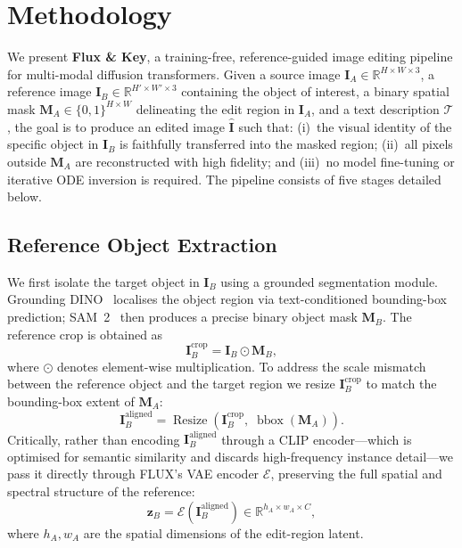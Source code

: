 \section{Methodology}
\label{sec:method}

We present \textbf{Flux \& Key}, a training-free, reference-guided image editing pipeline for
multi-modal diffusion transformers. Given a source image
$\mathbf{I}_A \in \mathbb{R}^{H \times W \times 3}$, a reference image
$\mathbf{I}_B \in \mathbb{R}^{H' \times W' \times 3}$ containing the object of interest, a
binary spatial mask $\mathbf{M}_A \in \{0,1\}^{H \times W}$ delineating the edit region in
$\mathbf{I}_A$, and a text description $\mathcal{T}$, the goal is to produce an edited image
$\hat{\mathbf{I}}$ such that:
(i)~the visual identity of the specific object in $\mathbf{I}_B$ is faithfully transferred into
the masked region;
(ii)~all pixels outside $\mathbf{M}_A$ are reconstructed with high fidelity; and
(iii)~no model fine-tuning or iterative ODE inversion is required.
The pipeline consists of five stages detailed below.

\subsection{Reference Object Extraction}

We first isolate the target object in $\mathbf{I}_B$ using a grounded segmentation module.
Grounding DINO~\citep{liu2023grounding} localises the object region via text-conditioned
bounding-box prediction; SAM~2~\citep{ravi2024sam2} then produces a precise binary object
mask $\mathbf{M}_B$.
The reference crop is obtained as
\begin{equation}
    \mathbf{I}_B^{\text{crop}} = \mathbf{I}_B \odot \mathbf{M}_B,
    \label{eq:crop}
\end{equation}
where $\odot$ denotes element-wise multiplication.
To address the scale mismatch between the reference object and the target region we resize
$\mathbf{I}_B^{\text{crop}}$ to match the bounding-box extent of $\mathbf{M}_A$:
\begin{equation}
    \mathbf{I}_B^{\text{aligned}} =
        \operatorname{Resize}\!\left(\mathbf{I}_B^{\text{crop}},\;
                                      \operatorname{bbox}(\mathbf{M}_A)\right).
    \label{eq:resize}
\end{equation}
Critically, rather than encoding $\mathbf{I}_B^{\text{aligned}}$ through a CLIP
encoder---which is optimised for semantic similarity and discards high-frequency instance
detail---we pass it directly through FLUX's VAE encoder $\mathcal{E}$,
preserving the full spatial and spectral structure of the reference:
\begin{equation}
    \mathbf{z}_B = \mathcal{E}\!\left(\mathbf{I}_B^{\text{aligned}}\right)
        \in \mathbb{R}^{h_A \times w_A \times C},
    \label{eq:ref_encode}
\end{equation}
where $h_A, w_A$ are the spatial dimensions of the edit-region latent.

